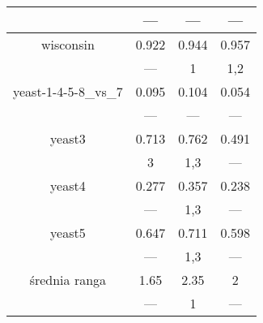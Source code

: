 \documentclass[a4paper,12pt]{article}
\begin{document}
\begin{table}[H]
\begin{center}
\begin{tabular}{|c|c|c|c|}
	& --- & --- & --- \\
    \hline
    wisconsin & 0.922 & 0.944 & 0.957 \\
	& --- & 1 & 1,2 \\
    \hline
    yeast-1-4-5-8\_vs\_7 & 0.095 & 0.104 & 0.054 \\
	& --- & --- & --- \\
    \hline
    yeast3 & 0.713 & 0.762 & 0.491 \\
	& 3 & 1,3 & --- \\
    \hline
    yeast4 & 0.277 & 0.357 & 0.238 \\
	& --- & 1,3 & --- \\
    \hline
    yeast5 & 0.647 & 0.711 & 0.598 \\
	& --- & 1,3 & --- \\
    \hline
    \hline
    średnia ranga & 1.65 & 2.35 & 2 \\
    & --- & 1 & --- \\
    \hline
    \end{tabular}
    \end{center}
\end{table}
\end{document}
